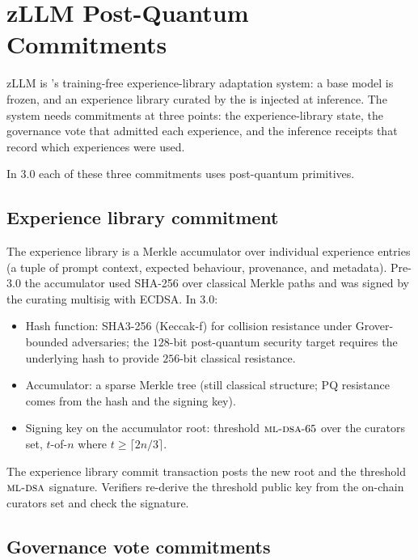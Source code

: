 \section{zLLM Post-Quantum Commitments}
\label{sec:zllm-pq}

zLLM is \Zoo{}'s training-free experience-library adaptation system:
a base model is frozen, and an experience library curated by the \DAO{}
is injected at inference. The system needs commitments at three
points: the experience-library state, the governance vote that
admitted each experience, and the inference receipts that record
which experiences were used.

In 3.0 each of these three commitments uses post-quantum primitives.

\subsection{Experience library commitment}

The experience library is a Merkle accumulator over individual
experience entries (a tuple of prompt context, expected behaviour,
provenance, and metadata). Pre-3.0 the accumulator used SHA-256 over
classical Merkle paths and was signed by the curating multisig with
ECDSA. In 3.0:

\begin{itemize}[leftmargin=1.2em]
  \item Hash function: SHA3-256 (Keccak-f) for collision resistance under
        Grover-bounded adversaries; the $128$-bit post-quantum security
        target requires the underlying hash to provide $256$-bit
        classical resistance.
  \item Accumulator: a sparse Merkle tree (still classical structure;
        PQ resistance comes from the hash and the signing key).
  \item Signing key on the accumulator root: threshold
        $\textsc{ml-dsa}{}\text{-}65$ over the curators set, $t$-of-$n$ where
        $t \geq \lceil 2n/3 \rceil$.
\end{itemize}

The experience library commit transaction posts the new root and the
threshold $\textsc{ml-dsa}{}$ signature. Verifiers re-derive the threshold
public key from the on-chain curators set and check the signature.

\subsection{Governance vote commitments}

